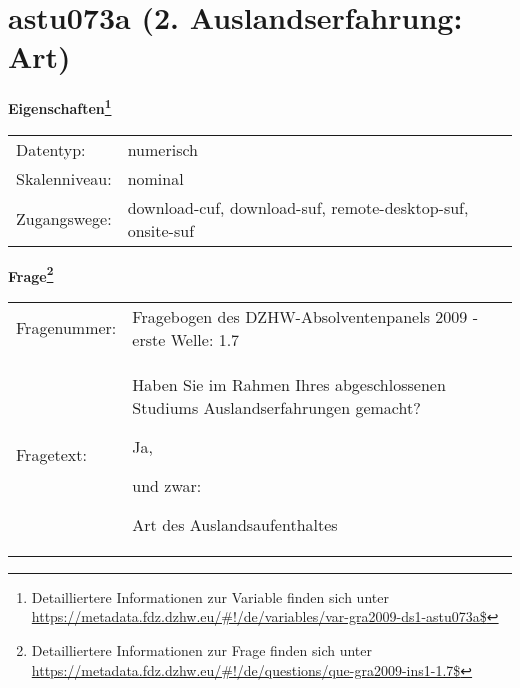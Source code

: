 
    \setcounter{footnote}{0}

    \vspace*{-1.8cm}
	\section{astu073a (2. Auslandserfahrung: Art)}
	\label{section:astu073a}



    \vspace*{0.5cm}
    \noindent\textbf{Eigenschaften\footnote{Detailliertere Informationen zur Variable finden sich unter
		\url{https://metadata.fdz.dzhw.eu/\#!/de/variables/var-gra2009-ds1-astu073a$}}}\\
	\begin{tabularx}{\hsize}{@{}lX}
	Datentyp: & numerisch \\
	Skalenniveau: & nominal \\
	Zugangswege: &
	  download-cuf, 
	  download-suf, 
	  remote-desktop-suf, 
	  onsite-suf
 \\
    \end{tabularx}



				\vspace*{0.5cm}
                \noindent\textbf{Frage\footnote{Detailliertere Informationen zur Frage finden sich unter
		              \url{https://metadata.fdz.dzhw.eu/\#!/de/questions/que-gra2009-ins1-1.7$}}}\\
				\begin{tabularx}{\hsize}{@{}lX}
					Fragenummer: &
					  Fragebogen des DZHW-Absolventenpanels 2009 - erste Welle:
					  1.7
 \\
					Fragetext: & Haben Sie im Rahmen Ihres abgeschlossenen Studiums Auslandserfahrungen gemacht?\par  Ja,\par  und zwar:\par  Art des Auslandsaufenthaltes \\
				\end{tabularx}





